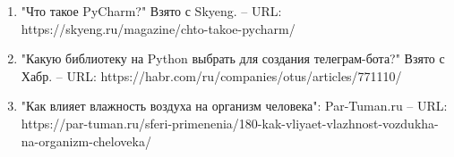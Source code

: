 \begin{enumerate}
    \item \label{i8} "Что такое PyCharm?" Взято с Skyeng. – URL: https://skyeng.ru/magazine/chto-takoe-pycharm/ 

    \item "Какую библиотеку на Python выбрать для создания телеграм-бота?" Взято с Хабр. – URL: https://habr.com/ru/companies/otus/articles/771110/ 

    \item \label{i9} "Как влияет влажность воздуха на организм человека": Par-Tuman.ru – URL: https://par-tuman.ru/sferi-primenenia/180-kak-vliyaet-vlazhnost-vozdukha-na-organizm-cheloveka/ 

\end{enumerate}

